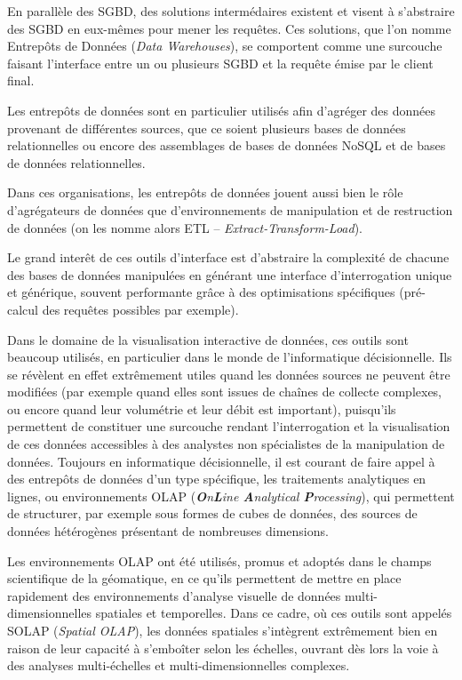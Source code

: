 			En parallèle des SGBD, des solutions intermédaires existent et visent à s'abstraire des SGBD en eux-mêmes pour mener les requêtes.
			Ces solutions, que l'on nomme Entrepôts de Données (\textit{Data Warehouses}), se comportent comme une surcouche faisant l'interface entre un ou plusieurs SGBD et la requête émise par le client final.
			
			Les entrepôts de données sont en particulier utilisés afin d'agréger des données provenant de différentes sources, que ce soient plusieurs bases de données relationnelles ou encore des assemblages de bases de données NoSQL et de bases de données relationnelles.
			
			Dans ces organisations, les entrepôts de données jouent aussi bien le rôle d'agrégateurs de données que d'environnements de manipulation et de restruction de données (on les nomme alors \og ETL\fg{} -- \textit{Extract-Transform-Load}).
			
			Le grand interêt de ces outils d'interface est d'abstraire la complexité de chacune des bases de données manipulées en générant une interface d'interrogation unique et générique, souvent performante grâce à des optimisations spécifiques (pré-calcul des requêtes possibles par exemple).
			
			Dans le domaine de la visualisation interactive de données, ces outils sont beaucoup utilisés, en particulier dans le monde de l'informatique décisionnelle.
			Ils se révèlent en effet extrêmement utiles quand les données sources ne peuvent être modifiées (par exemple quand elles sont issues de chaînes de collecte complexes, ou encore quand leur volumétrie et leur débit est important), puisqu'ils permettent de constituer une surcouche rendant l'interrogation et la visualisation de ces données accessibles à des analystes non spécialistes de la manipulation de données.
			Toujours en informatique décisionnelle, il est courant de faire appel à des entrepôts de données d'un type spécifique, les \og traitements analytiques en lignes\fg{}, ou environnements OLAP (\textit{\textbf{O}n\textbf{L}ine \textbf{A}nalytical \textbf{P}rocessing}), qui permettent de structurer, par exemple sous formes de cubes de données, des sources de données hétérogènes présentant de nombreuses dimensions.
			
			Les environnements OLAP ont été utilisés, promus et adoptés dans le champs scientifique de la géomatique, en ce qu'ils permettent de mettre en place rapidement des environnements d'analyse visuelle de données multi-dimensionnelles spatiales et temporelles.
			Dans ce cadre, où ces outils sont appelés \og SOLAP\fg{} (\textit{Spatial OLAP}), les données spatiales s'intègrent extrêmement bien en raison de leur capacité à s'emboîter selon les échelles, ouvrant dès lors la voie à des analyses multi-échelles et multi-dimensionnelles complexes.
			

